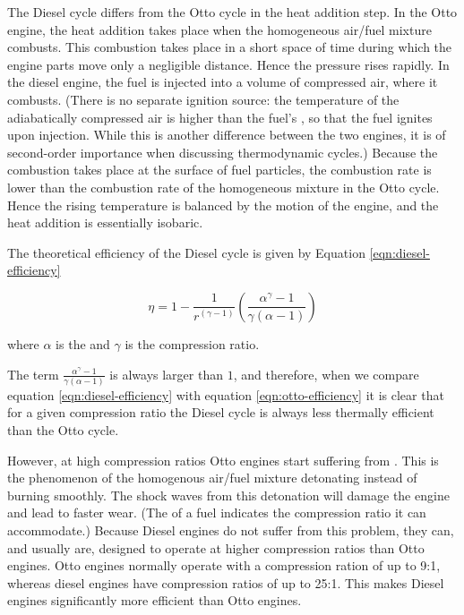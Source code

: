 The Diesel cycle differs from the Otto cycle in the heat addition step. In the
Otto engine, the heat addition takes place when the homogeneous air/fuel mixture
combusts. This combustion takes place in a short space of time during which the
engine parts move only a negligible distance. Hence the pressure rises rapidly.
In the diesel engine, the fuel is injected into a volume of compressed air,
where it combusts. (There is no separate ignition source: the temperature of the
adiabatically compressed air is higher than the fuel's , so that the fuel ignites upon injection. While this is another
difference between the two engines, it is of second-order importance when
discussing thermodynamic cycles.) Because the combustion takes place at the
surface of fuel particles, the combustion rate is lower than the combustion rate
of the homogeneous mixture in the Otto cycle. Hence the rising temperature is
balanced by the motion of the engine, and the heat addition is essentially
isobaric.

The theoretical efficiency of the Diesel cycle is given by Equation
\ref{eqn:diesel-efficiency}

\begin{equation}
	\eta = 1 - \frac{1}{r^{(\gamma - 1 )}}(\frac{\alpha^{\gamma}-1}{\gamma(\alpha-1)})
\label{eqn:diesel-efficiency}
\end{equation}
 
where \(\alpha\) is the  and \(\gamma\) is the compression ratio.

The term \( \frac{\alpha^{\gamma}-1}{\gamma(\alpha-1)} \) is always larger
than \(1 \), and therefore, when we compare equation \ref{eqn:diesel-efficiency}
with equation \ref{eqn:otto-efficiency} it is clear that for a given
compression ratio the Diesel cycle is always less thermally efficient than the
Otto cycle. 

However, at high compression ratios Otto engines start suffering from
. This is the phenomenon of the homogenous air/fuel mixture
detonating instead of burning smoothly. The shock waves from this detonation
will damage the engine and lead to faster wear. (The  of
a fuel indicates the compression ratio it can accommodate.) Because Diesel
engines do not suffer from this problem, they can, and usually are, designed to
operate at higher compression ratios than Otto engines.  Otto engines normally
operate with a compression ration of up to 9:1, whereas diesel engines have
compression ratios of up to 25:1. This makes Diesel engines significantly more
efficient than Otto engines.

